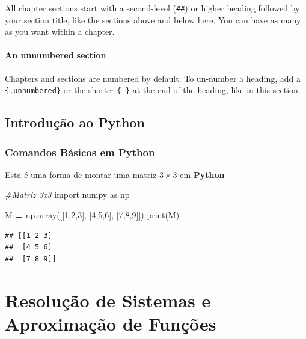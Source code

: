 \documentclass[
]{book}
\newenvironment{Shaded}{\begin{snugshade}}{\end{snugshade}}
\newcommand{\BuiltInTok}[1]{#1}
\newcommand{\CommentTok}[1]{\textcolor[rgb]{0.56,0.35,0.01}{\textit{#1}}}
\newcommand{\DecValTok}[1]{\textcolor[rgb]{0.00,0.00,0.81}{#1}}
\newcommand{\ImportTok}[1]{#1}
\newcommand{\NormalTok}[1]{#1}
\newcommand{\OperatorTok}[1]{\textcolor[rgb]{0.81,0.36,0.00}{\textbf{#1}}}
\begin{document}
All chapter sections start with a second-level (\texttt{\#\#}) or higher heading followed by your section title, like the sections above and below here. You can have as many as you want within a chapter.

\hypertarget{an-unnumbered-section}{%
\subsection*{An unnumbered section}\label{an-unnumbered-section}}

Chapters and sections are numbered by default. To un-number a heading, add a \texttt{\{.unnumbered\}} or the shorter \texttt{\{-\}} at the end of the heading, like in this section.

\hypertarget{cross}{%
\chapter{Introdução ao Python}\label{cross}}

\hypertarget{comandos-buxe1sicos-em-python}{%
\section{Comandos Básicos em Python}\label{comandos-buxe1sicos-em-python}}

Esta é uma forma de montar uma matriz \(3 \times 3\) em \textbf{Python}

\begin{Shaded}
\begin{Highlighting}[]
\CommentTok{\#Matriz 3x3}
\ImportTok{import}\NormalTok{ numpy }\ImportTok{as}\NormalTok{ np}

\NormalTok{M }\OperatorTok{=}\NormalTok{ np.array([[}\DecValTok{1}\NormalTok{,}\DecValTok{2}\NormalTok{,}\DecValTok{3}\NormalTok{],}
\NormalTok{              [}\DecValTok{4}\NormalTok{,}\DecValTok{5}\NormalTok{,}\DecValTok{6}\NormalTok{],}
\NormalTok{              [}\DecValTok{7}\NormalTok{,}\DecValTok{8}\NormalTok{,}\DecValTok{9}\NormalTok{]])}
\BuiltInTok{print}\NormalTok{(M)}
\end{Highlighting}
\end{Shaded}

\begin{verbatim}
## [[1 2 3]
##  [4 5 6]
##  [7 8 9]]
\end{verbatim}

\hypertarget{part-resoluuxe7uxe3o-de-sistemas-e-aproximauxe7uxe3o-de-funuxe7uxf5es}{%
\part{Resolução de Sistemas e Aproximação de Funções}\label{part-resoluuxe7uxe3o-de-sistemas-e-aproximauxe7uxe3o-de-funuxe7uxf5es}}
\end{document}
